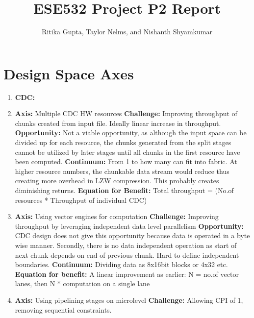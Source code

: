 \documentclass{article}
\title{ESE532 Project P2 Report}
\author{Ritika Gupta, Taylor Nelms, and Nishanth Shyamkumar}
\begin{document}
\maketitle


\section{Design Space Axes}
\begin{enumerate}
\item%

\textbf{CDC:}
\item%
\textbf{Axis:} Multiple CDC HW resources
\newline
\textbf{Challenge:} Improving throughput of chunks created from input file. Ideally linear increase in throughput. 
\newline
\textbf{Opportunity:} Not a viable opportunity, as although the input space can be divided up for each resource, the chunks generated from the split stages cannot be utilized by later stages until all chunks in the first resource have been computed.
\newline
\textbf{Continuum:} From 1 to how many can fit into fabric. At higher resource numbers, the chunkable data stream would reduce thus creating more overhead in LZW compression. This probably creates diminishing returns.
\newline
\textbf{Equation for Benefit:} Total throughput = (No.of resources * Throughput of individual CDC)
\item%
\textbf{Axis:} Using vector engines for computation
\newline
\textbf{Challenge: } Improving throughput by leveraging independent data level parallelism
\newline
\textbf{Opportunity: } CDC design does not give this opportunity because data is operated in a byte wise manner. Secondly, there is no data independent operation as start of next chunk depends on end of previous chunk. Hard to define independent boundaries.
\newline
\textbf{Continuum:} Dividing data as 8x16bit blocks or 4x32 etc. 
\newline
\textbf{Equation for benefit:} A linear improvement as earlier:
\newline
N = no.of vector lanes, then N * computation on a single lane
\item%
\textbf{Axis:} Using pipelining stages on microlevel
\newline
\textbf{Challenge:} Allowing CPI of 1, removing sequential constraints.

\end{enumerate}
\end{document}
